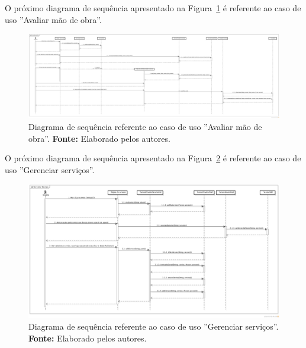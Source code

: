 \begin{landscape}
O próximo diagrama de sequência apresentado na Figura~\ref{fig:ap1:diagrama_sequencia_avaliar_mao_de_obra} é referente ao caso de uso ''Avaliar mão de obra''.

\newpage
\captionsetup[figure]{list=no}
\begin{figure}[h!]
	\centerline{\includegraphics[scale=0.2]{./imagens/apendices/diagrama-sequencia-avaliar-mao-de-obra.png}}
	\caption[Diagrama de sequência referente ao caso de uso ''Avaliar mão de obra''.]
	{Diagrama de sequência referente ao caso de uso ''Avaliar mão de obra''. \textbf{Fonte:} Elaborado pelos autores.}
	\label{fig:ap1:diagrama_sequencia_avaliar_mao_de_obra}
\end{figure}

O próximo diagrama de sequência apresentado na Figura~\ref{fig:ap1:diagrama_sequencia_gerenciar_servicos} é referente ao caso de uso ''Gerenciar serviços''.

\newpage
\captionsetup[figure]{list=no}
\begin{figure}[h!]
	\centerline{\includegraphics[scale=0.4]{./imagens/apendices/diagrama-sequencia-gerenciar-servicos.png}}
	\caption[Diagrama de sequência referente ao caso de uso ''Gerenciar serviços''.]
	{Diagrama de sequência referente ao caso de uso ''Gerenciar serviços''. \textbf{Fonte:} Elaborado pelos autores.}
	\label{fig:ap1:diagrama_sequencia_gerenciar_servicos}
\end{figure}


\end{landscape}
